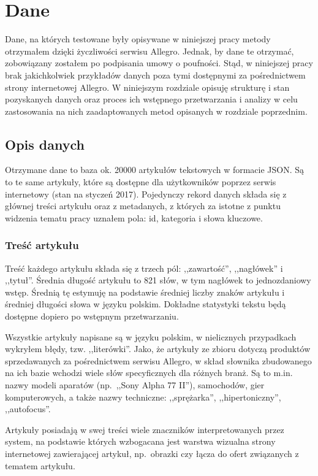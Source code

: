 \documentclass[pl]{minipw} %
\begin{document}
\chapter{Dane}

Dane, na których testowane były opisywane w niniejszej pracy metody otrzymałem dzięki życzliwości serwisu Allegro. Jednak, by dane te otrzymać, zobowiązany zostałem po podpisania umowy o poufności. Stąd, w niniejszej pracy brak jakichkolwiek przykładów danych poza tymi dostępnymi za pośrednictwem strony internetowej Allegro. W niniejszym rozdziale opisuję strukturę i stan pozyskanych danych oraz proces ich wstępnego przetwarzania i analizy w celu zastosowania na nich zaadaptowanych metod opisanych w rozdziale poprzednim. 

\section{Opis danych}

Otrzymane dane to baza ok. 20000 artykułów tekstowych w formacie JSON. Są to te same artykuły, które są dostępne dla użytkowników poprzez serwis internetowy (stan na styczeń 2017). Pojedynczy rekord danych składa się z głównej treści artykułu oraz z metadanych, z których za istotne z punktu widzenia tematu pracy uznałem pola: id, kategoria i słowa kluczowe.

\subsection{Treść artykułu}

Treść każdego artykułu składa się z trzech pól: ,,zawartość'', ,,nagłówek'' i ,,tytuł''. Średnia długość artykułu to 821 słów, w tym nagłówek to jednozdaniowy wstęp. Średnią tę estymuję na podstawie średniej liczby znaków artykułu i średniej długości słowa w języku polskim. Dokładne statystyki tekstu będą dostępne dopiero po wstępnym przetwarzaniu.

Wszystkie artykuły napisane są w języku polskim, w nielicznych przypadkach wykryłem błędy, tzw. ,,literówki''. Jako, że artykuły ze zbioru dotyczą produktów sprzedawanych za pośrednictwem serwisu Allegro, w skład słownika zbudowanego na ich bazie wchodzi wiele słów specyficznych dla różnych branż. Są to m.in. nazwy modeli aparatów (np.~,,Sony Alpha 77 II''), samochodów, gier komputerowych, a także nazwy techniczne: ,,sprężarka'', ,,hipertoniczny'', ,,autofocus''.

Artykuły posiadają w swej treści wiele znaczników interpretowanych przez system, na podstawie których wzbogacana jest warstwa wizualna strony internetowej zawierającej artykuł, np.~obrazki czy łącza do ofert związanych z tematem artykułu.
\end{document}

